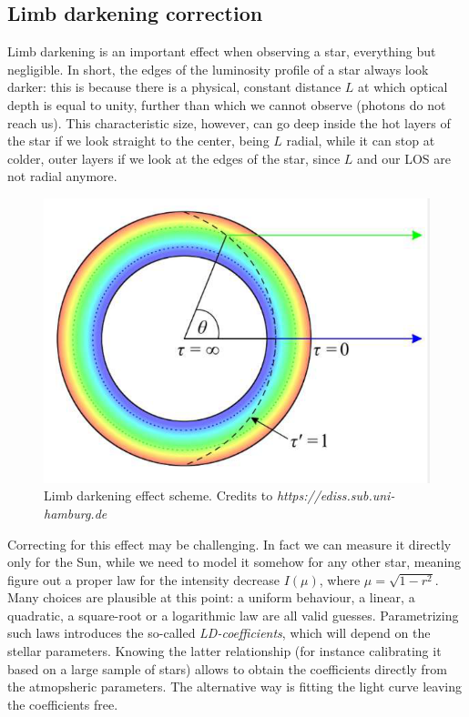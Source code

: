 \documentclass[a4paper,11pt,twocolumn]{article}
\begin{document}
\subsection{Limb darkening correction}

Limb darkening is an important effect when observing a star, 
everything but negligible. In short, the edges of the luminosity profile 
of a star always look darker: this is because there is a physical, constant 
distance $L$ at which optical depth is equal to unity, further than which 
we cannot observe (photons do not reach us). This characteristic size, 
however, can go deep inside the hot layers of the star if we look straight 
to the center, being $L$ radial, while it can stop at colder, outer layers 
if we look at the edges of the star, since $L$ and our LOS are not radial 
anymore.
\begin{figure}[H]
    \centering  
    \includegraphics[scale=0.25, angle=0]{../pictures/limb_darkening.png}
    \caption{Limb darkening effect scheme. Credits to \textit{https://ediss.sub.uni-hamburg.de}}
\end{figure}
Correcting for this effect may be challenging. In fact we can measure it 
directly only for the Sun, while we need to model it somehow for any other 
star, meaning figure out a proper law for the intensity decrease $I(\mu)$, 
where $\mu = \sqrt{1-r^2}$. Many choices are plausible at this point: a 
uniform behaviour, a linear, a quadratic, a square-root or a 
logarithmic law are all valid guesses. Parametrizing such laws introduces 
the so-called \textit{LD-coefficients}, which will depend on the stellar 
parameters. Knowing the latter relationship (for instance calibrating it 
based on a large sample of stars) allows to obtain the coefficients directly 
from the atmopsheric parameters. 
The alternative way is fitting the light curve leaving the coefficients free.
\end{document}
